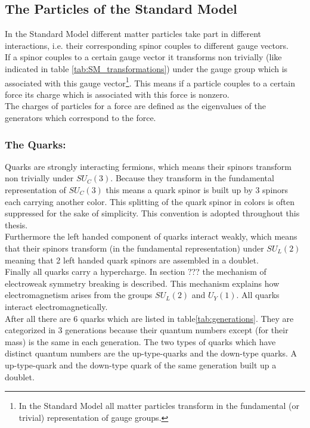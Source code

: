 \subsection{The Particles of the Standard Model}
In the Standard Model different matter particles take part in different interactions, i.e. their corresponding spinor couples to different gauge vectors.\\
If a spinor couples to a certain gauge vector it transforms  non trivially (like indicated in table \ref{tab:SM_transformations}) under the gauge group which is associated with this gauge vector\footnote{In the Standard Model all matter particles transform in the fundamental (or trivial) representation of gauge groups.}. This means if a particle couples to a certain force its charge which is associated with this force is nonzero.\\
The charges of particles for a force are defined as the eigenvalues of the generators which correspond to the force.
\subsubsection*{The Quarks:}
Quarks are strongly interacting fermions, which means their spinors transform non trivially under $SU_C(3)$. Because they transform in the fundamental representation of $SU_C(3)$ this means a quark spinor is built up by 3 spinors each carrying another color. This splitting of the quark spinor in colors is often suppressed for the sake of simplicity. This convention is adopted throughout this thesis.\\
Furthermore the left handed component of quarks interact weakly, which means that their spinors transform (in the fundamental representation) under $SU_L(2)$ meaning that 2 left handed quark spinors are assembled in a doublet.\\
Finally all quarks carry a hypercharge. In section ??? the mechanism of electroweak symmetry breaking is described. This mechanism explains how electromagnetism arises from the groups $SU_L(2)$ and $U_Y(1)$. All quarks interact electromagnetically.\\
After all there are 6 quarks which are listed in table\ref{tab:generations}. They are categorized in 3 generations because their quantum numbers except (for their mass) is the same in each generation. The two types of quarks which have distinct quantum numbers are the up-type-quarks and the down-type quarks. A up-type-quark and the down-type quark of the same generation built up a doublet.

